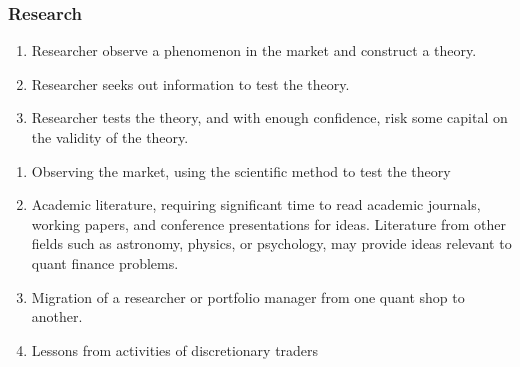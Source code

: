 \subsubsection{Research}

\begin{definition} 
\begin{enumerate}[label=\arabic*.]
\setlength{\itemsep}{0pt}
\item Researcher observe a phenomenon in the market and construct a theory.
\item Researcher seeks out information to test the theory.
\item Researcher tests the theory, and with enough confidence, risk some capital on the validity of the theory.
\end{enumerate}
\end{definition}

\begin{remark} 
\begin{enumerate}[label=\arabic*.]
\setlength{\itemsep}{0pt}
\item Observing the market, using the scientific method to test the theory
\item Academic literature, requiring significant time to read academic journals, working papers, and conference presentations for ideas. Literature from other fields such as astronomy, physics, or psychology, may provide ideas relevant to quant finance problems.
\item Migration of a researcher or portfolio manager from one quant shop to another.
\item Lessons from activities of discretionary traders
\end{enumerate}
\end{remark}

